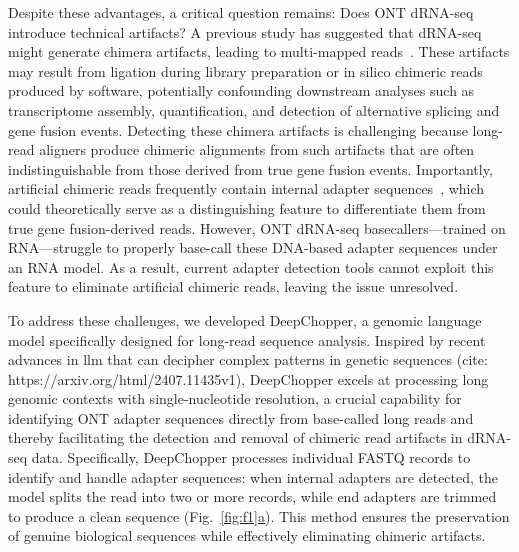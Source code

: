 \documentclass[pdflatex,sn-nature, lineno]{sn-jnl}%
\newcommand{\figref}[2]{Fig.~\hyperref[#1]{\ref*{#1}#2}}
\theoremstyle{thmstyleone}%
\theoremstyle{thmstyletwo}%
\theoremstyle{thmstylethree}%
\begin{document}
Despite these advantages, a critical question remains: Does ONT dRNA-seq introduce technical artifacts? A previous study has suggested that dRNA-seq might generate chimera artifacts, leading to multi-mapped reads~\cite{smith2020molecular}. These artifacts may result from ligation during library preparation or in silico chimeric reads produced by software, potentially confounding downstream analyses such as transcriptome assembly, quantification, and detection of alternative splicing and gene fusion events. Detecting these chimera artifacts is challenging because long-read aligners produce chimeric alignments from such artifacts that are often indistinguishable from those derived from true gene fusion events. Importantly, artificial chimeric reads frequently contain internal adapter sequences~\cite{smith2020molecular}, which could theoretically serve as a distinguishing feature to differentiate them from true gene fusion-derived reads. However, ONT dRNA-seq basecallers—trained on RNA—struggle to properly base-call these DNA-based adapter sequences under an RNA model. As a result, current adapter detection tools cannot exploit this feature to eliminate artificial chimeric reads, leaving the issue unresolved.

To address these challenges, we developed DeepChopper, a genomic language model specifically designed for long-read sequence analysis. Inspired by recent advances in \gls{llm} that can decipher complex patterns in genetic sequences (cite: https://arxiv.org/html/2407.11435v1), DeepChopper excels at processing long genomic contexts with single-nucleotide resolution, a crucial capability for identifying ONT adapter sequences directly from base-called long reads and thereby facilitating the detection and removal of chimeric read artifacts in dRNA-seq data. Specifically, DeepChopper processes individual FASTQ records to identify and handle adapter sequences: when internal adapters are detected, the model splits the read into two or more records, while end adapters are trimmed to produce a clean sequence (\figref{fig:f1}{a}). This method ensures the preservation of genuine biological sequences while effectively eliminating chimeric artifacts. 
\end{document}
